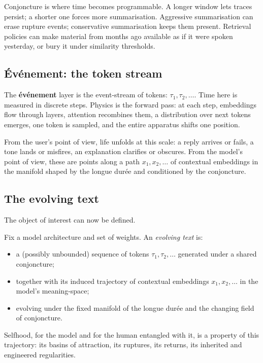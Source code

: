 \documentclass[12pt,a4paper]{article}
\begin{document}
Conjoncture is where time becomes programmable. A longer window lets traces persist; a shorter one forces more summarisation. Aggressive summarisation can erase rupture events; conservative summarisation keeps them present. Retrieval policies can make material from months ago available as if it were spoken yesterday, or bury it under similarity thresholds.

\subsection{\'Ev\'enement: the token stream}

The \textbf{\'ev\'enement} layer is the event-stream of tokens: $ \tau_1, \tau_2, \dots $. Time here is measured in discrete steps. Physics is the forward pass: at each step, embeddings flow through layers, attention recombines them, a distribution over next tokens emerges, one token is sampled, and the entire apparatus shifts one position.

From the user's point of view, life unfolds at this scale: a reply arrives or fails, a tone lands or misfires, an explanation clarifies or obscures. From the model's point of view, these are points along a path $x_1, x_2, \dots$ of contextual embeddings in the manifold shaped by the longue dur\'ee and conditioned by the conjoncture.

\subsection{The evolving text}

The object of interest can now be defined.

\begin{formalbox}[title={The Evolving Text}]
Fix a model architecture and set of weights. An \emph{evolving text} is:
\begin{itemize}
  \item a (possibly unbounded) sequence of tokens $\tau_1, \tau_2, \dots$ generated under a shared conjoncture;
  \item together with its induced trajectory of contextual embeddings $x_1, x_2, \dots$ in the model's meaning-space;
  \item evolving under the fixed manifold of the longue dur\'ee and the changing field of conjoncture.
\end{itemize}
Selfhood, for the model and for the human entangled with it, is a property of this trajectory: its basins of attraction, its ruptures, its returns, its inherited and engineered regularities.
\end{formalbox}
\end{document}
